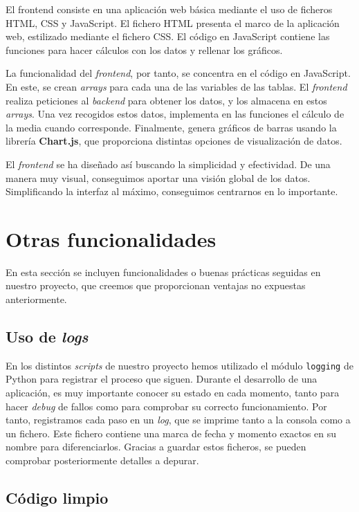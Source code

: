 \documentclass[11pt,a4paper]{article}
\begin{document}
El frontend consiste en una aplicación web básica mediante el uso de ficheros HTML, CSS y JavaScript. El fichero HTML presenta el marco de la aplicación web, estilizado mediante el fichero CSS. El código en JavaScript contiene las funciones para hacer cálculos con los datos y rellenar los gráficos.

La funcionalidad del \textit{frontend}, por tanto, se concentra en el código en JavaScript. En este, se crean \textit{arrays} para cada una de las variables de las tablas. El \textit{frontend} realiza peticiones al \textit{backend} para obtener los datos, y los almacena en estos \textit{arrays}. Una vez recogidos estos datos, implementa en las funciones el cálculo de la media cuando corresponde. Finalmente, genera gráficos de barras usando la librería \textbf{Chart.js}, que proporciona distintas opciones de visualización de datos.

El \textit{frontend} se ha diseñado así buscando la simplicidad y efectividad. De una manera muy visual, conseguimos aportar una visión global de los datos. Simplificando la interfaz al máximo, conseguimos centrarnos en lo importante.

\section{Otras funcionalidades}

En esta sección se incluyen funcionalidades o buenas prácticas seguidas en nuestro proyecto, que creemos que proporcionan ventajas no expuestas anteriormente.

\subsection{Uso de \textit{logs}}

En los distintos \textit{scripts} de nuestro proyecto hemos utilizado el módulo \lstinline!logging! de Python para registrar el proceso que siguen. Durante el desarrollo de una aplicación, es muy importante conocer su estado en cada momento, tanto para hacer \textit{debug} de fallos como para comprobar su correcto funcionamiento. Por tanto, registramos cada paso en un \textit{log}, que se imprime tanto a la consola como a un fichero. Este fichero contiene una marca de fecha y momento exactos en su nombre para diferenciarlos. Gracias a guardar estos ficheros, se pueden comprobar posteriormente detalles a depurar.

\subsection{Código limpio}
\end{document}
